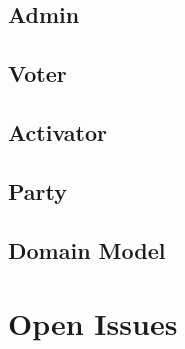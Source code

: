 \documentclass[11pt]{article}
\begin{document}
	\subsection{Admin}
		
		\newpage	
		
	\subsection{Voter}
		
		\newpage
		
	\subsection{Activator}
		
		\newpage
		
	\subsection{Party}
		
		
	\subsection{Domain Model}
		
		
	\section{Open Issues}
		
	
\end{document}
